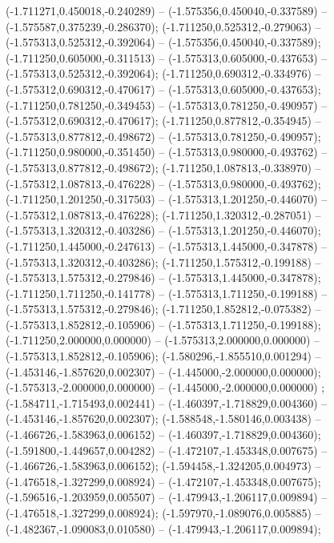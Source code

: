  (-1.711271,0.450018,-0.240289) -- (-1.575356,0.450040,-0.337589) -- (-1.575587,0.375239,-0.286370);
 (-1.711250,0.525312,-0.279063) -- (-1.575313,0.525312,-0.392064) -- (-1.575356,0.450040,-0.337589);
 (-1.711250,0.605000,-0.311513) -- (-1.575313,0.605000,-0.437653) -- (-1.575313,0.525312,-0.392064);
 (-1.711250,0.690312,-0.334976) -- (-1.575312,0.690312,-0.470617) -- (-1.575313,0.605000,-0.437653);
 (-1.711250,0.781250,-0.349453) -- (-1.575313,0.781250,-0.490957) -- (-1.575312,0.690312,-0.470617);
 (-1.711250,0.877812,-0.354945) -- (-1.575313,0.877812,-0.498672) -- (-1.575313,0.781250,-0.490957);
 (-1.711250,0.980000,-0.351450) -- (-1.575313,0.980000,-0.493762) -- (-1.575313,0.877812,-0.498672);
 (-1.711250,1.087813,-0.338970) -- (-1.575312,1.087813,-0.476228) -- (-1.575313,0.980000,-0.493762);
 (-1.711250,1.201250,-0.317503) -- (-1.575313,1.201250,-0.446070) -- (-1.575312,1.087813,-0.476228);
 (-1.711250,1.320312,-0.287051) -- (-1.575313,1.320312,-0.403286) -- (-1.575313,1.201250,-0.446070);
 (-1.711250,1.445000,-0.247613) -- (-1.575313,1.445000,-0.347878) -- (-1.575313,1.320312,-0.403286);
 (-1.711250,1.575312,-0.199188) -- (-1.575313,1.575312,-0.279846) -- (-1.575313,1.445000,-0.347878);
 (-1.711250,1.711250,-0.141778) -- (-1.575313,1.711250,-0.199188) -- (-1.575313,1.575312,-0.279846);
 (-1.711250,1.852812,-0.075382) -- (-1.575313,1.852812,-0.105906) -- (-1.575313,1.711250,-0.199188);
 (-1.711250,2.000000,0.000000) -- (-1.575313,2.000000,0.000000) -- (-1.575313,1.852812,-0.105906);
 (-1.580296,-1.855510,0.001294) -- (-1.453146,-1.857620,0.002307) -- (-1.445000,-2.000000,0.000000);
 (-1.575313,-2.000000,0.000000) -- (-1.445000,-2.000000,0.000000) ;
 (-1.584711,-1.715493,0.002441) -- (-1.460397,-1.718829,0.004360) -- (-1.453146,-1.857620,0.002307);
 (-1.588548,-1.580146,0.003438) -- (-1.466726,-1.583963,0.006152) -- (-1.460397,-1.718829,0.004360);
 (-1.591800,-1.449657,0.004282) -- (-1.472107,-1.453348,0.007675) -- (-1.466726,-1.583963,0.006152);
 (-1.594458,-1.324205,0.004973) -- (-1.476518,-1.327299,0.008924) -- (-1.472107,-1.453348,0.007675);
 (-1.596516,-1.203959,0.005507) -- (-1.479943,-1.206117,0.009894) -- (-1.476518,-1.327299,0.008924);
 (-1.597970,-1.089076,0.005885) -- (-1.482367,-1.090083,0.010580) -- (-1.479943,-1.206117,0.009894);
